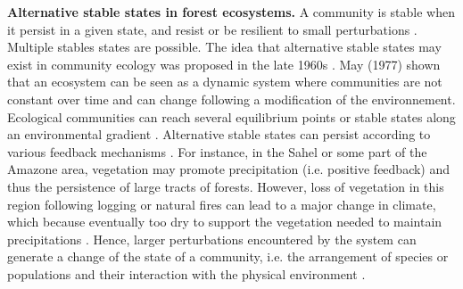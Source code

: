 \textbf{Alternative stable states in forest ecosystems.} A
community is stable when it persist in a given state, and resist or be
resilient to small perturbations \cite{Filbee-Dexter2013}. Multiple stables states are possible. The idea that
alternative stable states may exist in community ecology was proposed in the
late 1960s \cite{Scheffer2001,Society2014a}.  May (1977) \cite{May1977}
shown that an ecosystem can be seen as a dynamic system where
communities are not constant over time and can change following
a modification of the environnement. Ecological communities can reach several equilibrium
points or stable states along an environmental gradient \cite{May1977}. Alternative stable states
can persist according to various feedback mechanisms \cite{Filbee-Dexter2013}.
For instance, in the Sahel or some part of the Amazone area, vegetation may
promote precipitation (i.e. positive feedback) and thus the persistence of large tracts of forests. However, loss of vegetation  in
this region following logging or natural fires can lead to a major change in climate, which because eventually too dry to support the vegetation
needed to maintain precipitations \cite{scheffer2009critical}. Hence, larger
perturbations encountered by the system can generate a change of the state of a
community, i.e. the arrangement of species or populations and their
interaction with the physical environment \cite {Filbee-Dexter2013}. 

